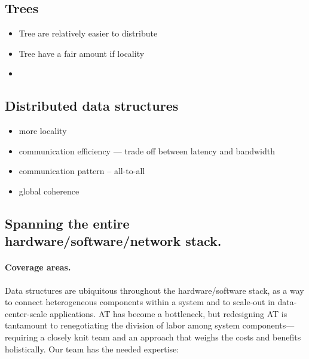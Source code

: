 \subsection{Trees}
\begin{itemize}
    \item Tree are relatively easier to distribute
    \item Tree have a fair amount if locality
    \item 
\end{itemize}

\subsection{Distributed data structures}

\begin{itemize}
    \item more locality
    \item communication efficiency --- trade off between latency and bandwidth
    \item communication pattern -- all-to-all 
    \item global coherence 
\end{itemize}

\subsection{Spanning the entire hardware/software/network stack.}


\paragraph{Coverage areas.} Data structures are ubiquitous throughout the
hardware/software stack, as a way to connect heterogeneous components within a
system and to scale-out in data-center-scale applications.  AT has become a
bottleneck, but redesigning AT is tantamount to renegotiating the division of
labor among system components---requiring a closely knit team and an approach
that weighs the costs and benefits holistically.
Our team has the needed expertise:

